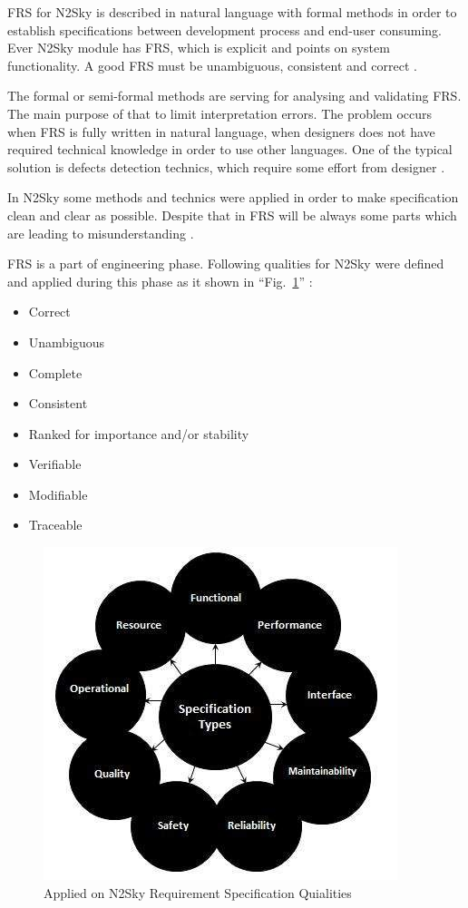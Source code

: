 FRS for N2Sky is described in natural language with formal methods in order to establish specifications between development process and end-user consuming. Ever N2Sky module has FRS, which is explicit and points on system functionality. A good FRS must be unambiguous, consistent and correct \cite{frs_1}.  
 
 The formal or semi-formal methods are serving for analysing and validating FRS. The main purpose of  that to limit interpretation errors. The problem occurs when FRS is fully written in natural language, when designers does not have required technical knowledge in order to use other languages. One of  the typical solution is defects detection technics, which require some effort from designer \cite{frs_3}. 
 
In N2Sky some methods and technics were applied in order to make specification clean and clear as possible. Despite that in FRS will be always some parts which are leading to misunderstanding \cite{frs_1}.
  
FRS is a part of engineering phase. Following qualities for N2Sky were defined and applied during this phase \cite{frs_4} as it shown in ``Fig.~\ref{fig:frs_req}'' :
\begin{itemize}
\item Correct
\item Unambiguous
\item Complete
\item Consistent
\item Ranked for importance and/or stability
\item Verifiable
\item Modifiable
\item Traceable 
\end{itemize}


\begin{figure}[htbp]
\begin{center}
  \includegraphics[scale=0.75]{components/4/pics/frs_req.jpg}
  \caption{Applied on N2Sky  Requirement Specification Quialities}
  \label{fig:frs_req}
\end{center}
\end{figure}



